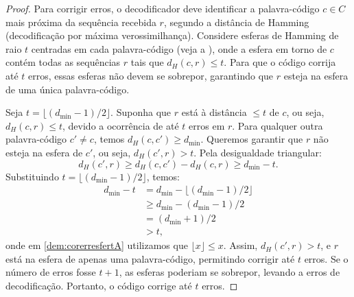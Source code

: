 \begin{proof}
Para corrigir erros, o decodificador deve identificar a palavra-código $c \in C$
mais próxima da sequência recebida $r$, segundo a distância de Hamming 
(decodificação por máxima verossimilhança). Considere esferas de Hamming de raio $t$
centradas em cada palavra-código (veja a ), 
onde a esfera em torno de $c$ contém todas as sequências $r$ 
tais que $d_H(c, r) \leq t$. Para que o código corrija até $t$ erros, essas esferas não 
devem se sobrepor, garantindo que $r$ esteja na esfera de uma única palavra-código.

Seja $t = \lfloor (d_{\text{min}} - 1)/2 \rfloor$. Suponha que $r$ está à distância
$\leq t$ de $c$, ou seja, $d_H(c, r) \leq t$, devido a ocorrência de até $t$ erros em $r$. Para qualquer
outra palavra-código $c' \neq c$, temos $d_H(c, c') \geq d_{\text{min}}$. 
Queremos garantir que $r$ não esteja na esfera de $c'$, ou seja, $d_H(c', r) > t$.
Pela desigualdade triangular:
\begin{equation}
d_H(c', r) \geq d_H(c, c') - d_H(c, r) \geq d_{\text{min}} - t.
\end{equation}
Substituindo $t = \lfloor (d_{\text{min}} - 1)/2 \rfloor$, temos:
\begin{subequations}
\begin{align}
  d_{\text{min}} - t &= d_{\text{min}} - \lfloor (d_{\text{min}} - 1)/2 \rfloor \\
                     &\geq d_{\text{min}} - (d_{\text{min}} - 1)/2 \label{dem:corerresfertA}\\
                     &= (d_{\text{min}} + 1)/2 \\
                     &> t,
\end{align}
\end{subequations}
onde em \ref{dem:corerresfertA} utilizamos que $\lfloor x \rfloor \leq x$.
Assim, $d_H(c', r) > t$, e $r$ está na esfera de apenas uma palavra-código, 
permitindo corrigir até $t$ erros. Se o número de erros fosse $t + 1$, as esferas
poderiam se sobrepor, levando a erros de decodificação. 
Portanto, o código corrige até $t$ erros.
\end{proof}

\begin{marginfigure}
    \centering
    \caption{Esferas de Hamming de raio $t = \lfloor (d_{\text{min}} - 1)/2 \rfloor$. As palavras-código $c$ e $c'$ estão separadas por $d_{\text{min}}$, garantindo que erros de até $t$ símbolos sejam corrigidos.}\label{fig:hammingspheres}
\end{marginfigure}



